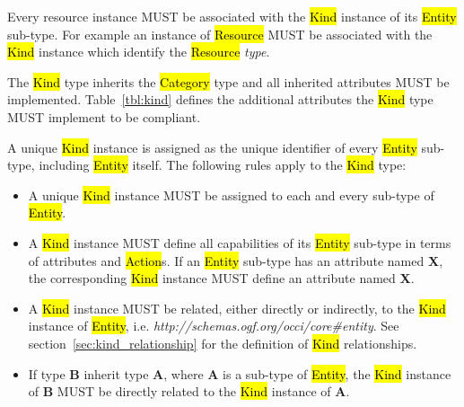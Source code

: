 \documentclass[10pt,a4paper,british]{article}
\begin{document}
Every resource instance MUST be associated with the \hl{Kind} instance of its
\hl{Entity} sub-type. For example an instance of \hl{Resource} MUST be
associated with the \hl{Kind} instance which identify the \hl{Resource} {\em
type}.

The \hl{Kind} type inherits the \hl{Category} type and all inherited
attributes MUST be implemented. Table~\ref{tbl:kind} defines the
additional attributes the \hl{Kind} type MUST implement to be compliant.

A unique \hl{Kind} instance is assigned as the unique identifier of every
\hl{Entity} sub-type, including \hl{Entity} itself. The following rules apply
to the \hl{Kind} type:
\begin{itemize}
\item A unique \hl{Kind} instance MUST be assigned to each and every sub-type
 of \hl{Entity}.
\item A \hl{Kind} instance MUST define all capabilities of its \hl{Entity}
 sub-type in terms of attributes and \hl{Action}s. If an \hl{Entity} sub-type
 has an attribute named {\bf X}, the corresponding \hl{Kind} instance MUST define
 an attribute named {\bf X}.
\item A \hl{Kind} instance MUST be related, either directly or indirectly, to
 the \hl{Kind} instance of \hl{Entity},
 i.e. \textit{http://schemas.ogf.org/occi/core\#entity}.
 See section~\ref{sec:kind_relationship} for the definition of \hl{Kind}
 relationships.
\item If type {\bf B} inherit type {\bf A}, where {\bf A} is a sub-type of
 \hl{Entity}, the \hl{Kind} instance of {\bf B} MUST be directly related to the
 \hl{Kind} instance of {\bf A}.
\end{itemize}
\end{document}
